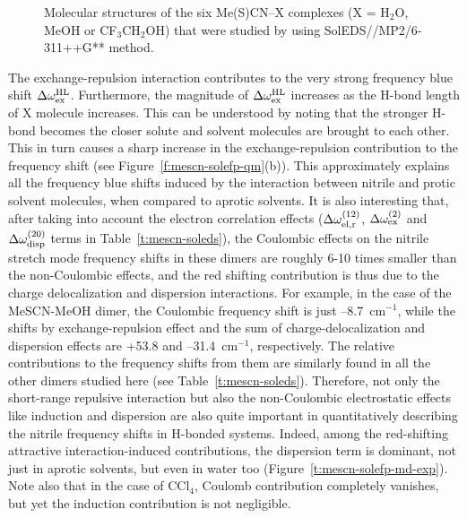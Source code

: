 \documentclass[b5paper,oneside,fleqn,11pt]{book}
\begin{document}
\begin{refsection}
\begin{figure}[t!]
{}
\caption{
Molecular structures of the six Me(S)CN--X complexes (X = H$_2$O, MeOH or CF$_3$CH$_2$OH)
that were studied by using SolEDS//MP2/6-311++G** method.
\label{f:mescn-soleds}}
\end{figure}
%
The exchange\hyp{}repulsion
interaction contributes to the very strong frequency
blue shift $\Delta\omega^{\rm HL}_{\rm ex}$. Furthermore, the magnitude of
$\Delta\omega^{\rm HL}_{\rm ex}$
increases as the H-bond length of X molecule increases.
This can be understood by noting that the stronger H-bond
becomes the closer solute and solvent molecules are brought
to each other. This in turn causes a sharp increase in the
exchange\hyp{}repulsion contribution to the frequency shift (see
Figure~\ref{f:mescn-solefp-qm}(b)). This approximately explains all the
frequency blue shifts induced by the interaction between
nitrile and protic solvent molecules, when compared to aprotic
solvents. It is also interesting that, after taking into account
the electron correlation effects
($\Delta\omega^{(12)}_{\rm el,r}$,
$\Delta\omega^{(2)}_{\rm ex}$
and $\Delta\omega^{(20)}_{\rm disp}$ terms in Table~\ref{t:mescn-soleds}), 
the Coulombic effects on the nitrile stretch mode
frequency shifts in these dimers are roughly 6-10 times smaller
than the non\hyp{}Coulombic effects, and the red shifting
contribution is thus due to the charge delocalization and
dispersion interactions. For example, in the case of the
MeSCN-MeOH dimer, the Coulombic frequency shift is just
--8.7~cm$^{-1}$, while the shifts by exchange\hyp{}repulsion effect and
the sum of charge\hyp{}delocalization and dispersion effects are
+53.8 and --31.4~cm$^{-1}$, respectively. The relative contributions
to the frequency shifts from them are similarly found in all the
other dimers studied here (see Table~\ref{t:mescn-soleds}). Therefore, not only
the short\hyp{}range repulsive interaction but also the 
non\hyp{}Coulombic electrostatic effects like induction and dispersion
are also quite important in quantitatively describing the nitrile
frequency shifts in H-bonded systems. Indeed, among the red-shifting
attractive interaction\hyp{}induced contributions, the
dispersion term is dominant, not just in aprotic solvents, but
even in water too (Figure~\ref{t:mescn-solefp-md-exp}). 
Note also that in the case of CCl$_4$,
Coulomb contribution completely vanishes, but yet the
induction contribution is not negligible.


\end{refsection}
\end{document}
